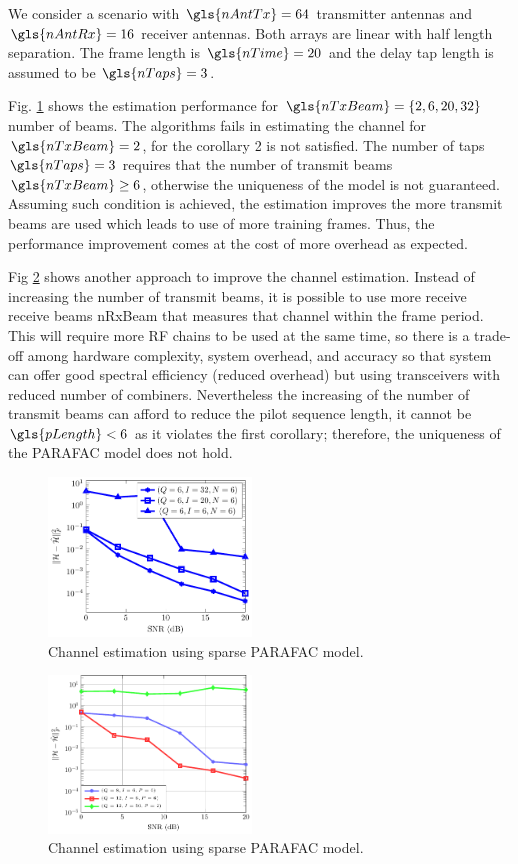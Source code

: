 \documentclass[conference]{IEEEtran}
\begin{document}
We consider a scenario with  $\gls{nAntTx}=64$ transmitter antennas and
$\gls{nAntRx}=16$ receiver antennas. Both arrays are linear with half length
separation. The frame length is $\gls{nTime} = 20$ and the delay tap length is
assumed to be $\gls{nTaps}=3$. 

Fig. \ref{fig:tx_beams}  shows the estimation performance for  $\gls{nTxBeam} =
\{2,6,20,32\}$ number of beams. The algorithms fails in estimating the channel
for $\gls{nTxBeam}=2$, for the corollary 2 is not satisfied. The number of taps
$\gls{nTaps}=3$ requires that the number of transmit beams $\gls{nTxBeam} \geq 6
$, otherwise the uniqueness of the model is not guaranteed. Assuming such
condition is achieved, the estimation improves the more transmit beams are
used which leads to use of more training frames. Thus, the performance
improvement comes at the cost of more overhead as expected.


Fig \ref{fig:rx_beams} shows another approach to improve the channel estimation. Instead
of increasing the number of transmit beams, it is possible to use more receive
receive beams \gls{nRxBeam} that measures that channel within the frame period. This will require more \gls{RF} chains to be used at the same time, so there
is a trade-off among hardware complexity, system overhead, and accuracy so that
system can offer good spectral efficiency (reduced overhead) but using
transceivers with reduced number of combiners. Nevertheless the increasing of
the number of transmit beams can afford to reduce the pilot sequence length, it cannot be $\gls{pLength}<6$ as it violates the
first corollary; therefore, the uniqueness of the \gls{PARAFAC} model does not hold. 


\begin{figure}[!t]
  \centering
  \includegraphics[width=0.48\textwidth]{fig/snr_nmse}
  \caption{Channel estimation using sparse PARAFAC model. }
  \label{fig:tx_beams}
\end{figure}

\begin{figure}[!t]
  \centering
  \includegraphics[width=0.48\textwidth]{fig/snr_nmse_rx}
  \caption{Channel estimation using sparse PARAFAC model. }
  \label{fig:rx_beams}
\end{figure}
\end{document}
